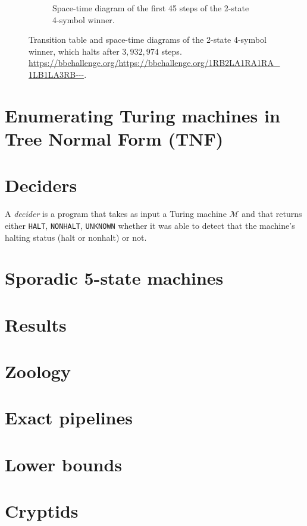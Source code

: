 \documentclass[a4paper,british]{article}
\theoremstyle{definition} %
\numberwithin{equation}{section}
\theoremstyle{definition} %
\newcommand{\BBTxF}{3{,}932{,}974}
\newcommand{\HALT}{\texttt{HALT}\xspace}
\newcommand{\NONHALT}{\texttt{NONHALT}\xspace}
\newcommand{\UNKNOWN}{\texttt{UNKNOWN}\xspace}
\begin{document}
\begin{figure}[h!]
\begin{subfigure}[t]{0.45\textwidth}
        \caption{Space-time diagram of the first 45 steps of the 2-state 4-symbol winner.}
        \label{fig:bb2x4-diagram}
    \end{subfigure}
    \caption{Transition table and space-time diagrams of the 2-state 4-symbol \BBfull winner, which halts after $\BBTxF$ steps.
        \url{https://bbchallenge.org/https://bbchallenge.org/1RB2LA1RA1RA_1LB1LA3RB---}.}
    \label{fig:bb2x4}
\end{figure}

\newpage
\section{Enumerating Turing machines in Tree Normal Form (TNF)}\label{sec:enum}

\newpage
\section{Deciders}\label{sec:deciders}

A \textit{decider} is a program that takes as input a Turing machine $\mathcal{M}$ and that returns either \HALT, \NONHALT, \UNKNOWN whether it was able to detect that the machine's halting status (halt or nonhalt) or not.






% 

\newpage


% 

\newpage
\section{Sporadic 5-state machines}\label{sec:sporadic}

\newpage
\section{Results}\label{sec:sporadic}

\newpage
\section{Zoology}\label{sec:sporadic}



\newpage


\appendix

\section{Exact pipelines}\label{app:pipelines}
\section{Lower bounds}\label{app:lowerbounds}
\section{Cryptids}\label{app:cryptids}
\end{document}

